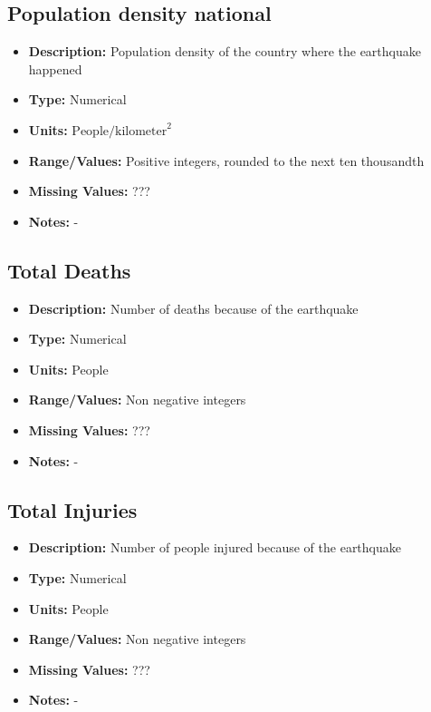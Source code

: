 \documentclass{article}
\begin{document}
\subsection{Population density national}
\begin{itemize}
    \item \textbf{Description:} Population density of the country where the earthquake happened
    \item \textbf{Type:} Numerical
    \item \textbf{Units:} $\text{People}/\text{kilometer}^2$
    \item \textbf{Range/Values:} Positive integers, rounded to the next ten thousandth
    \item \textbf{Missing Values:} ???
    \item \textbf{Notes:} -
\end{itemize}

\subsection{Total Deaths}
\begin{itemize}
    \item \textbf{Description:} Number of deaths because of the earthquake
    \item \textbf{Type:} Numerical
    \item \textbf{Units:} People
    \item \textbf{Range/Values:} Non negative integers
    \item \textbf{Missing Values:} ???
    \item \textbf{Notes:} -
\end{itemize}

\subsection{Total Injuries}
\begin{itemize}
    \item \textbf{Description:} Number of people injured because of the earthquake
    \item \textbf{Type:} Numerical
    \item \textbf{Units:} People
    \item \textbf{Range/Values:} Non negative integers
    \item \textbf{Missing Values:} ???
    \item \textbf{Notes:} -
\end{itemize}
\end{document}
